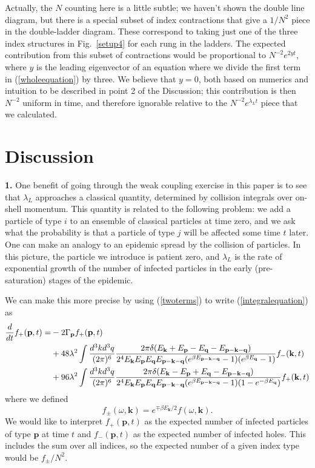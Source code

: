 \documentclass[12pt]{article}
\newcommand{\be}{\begin{equation}}
\newcommand{\ee}{\end{equation}}
\renewcommand{\k}{\mathbf{k}}
\newcommand{\p}{\mathbf{p}}
\newcommand{\q}{\mathbf{q}}
\begin{document}
Actually, the $N$ counting here is a little subtle; we haven't shown the double line diagram, but there is a special subset of index contractions that give a $1/N^2$ piece in the double-ladder diagram. These correspond to taking just one of the three index structures in Fig.~\ref{setup4} for each rung in the ladders. The expected contribution from this subset of contractions would be proportional to $N^{-2}e^{2y t}$, where $y$ is the leading eigenvector of an equation where we divide the first term in (\ref{wholeequation}) by three. We believe that $y = 0$, both based on numerics and intuition to be described in point 2 of the Discussion; this contribution is then $N^{-2}$ uniform in time, and therefore ignorable relative to the $N^{-2}e^{\lambda_L t}$ piece that we calculated.

\section{Discussion}
{\bf 1.} One benefit of going through the weak coupling exercise in this paper is to see that $\lambda_L$ approaches a classical quantity, determined by collision integrals over on-shell momentum. This quantity is related to the following problem: we add a particle of type $i$ to an ensemble of classical particles at time zero, and we ask what the probability is that a particle of type $j$ will be affected some time $t$ later. One can make an analogy to an epidemic \cite{Sekino:2008he,contagion,husekim} spread by the collision of particles. In this picture, the particle we introduce is patient zero, and $\lambda_L$ is the rate of exponential growth of the number of infected particles in the early (pre-saturation) stages of the epidemic.

We can make this more precise by using (\ref{twoterms}) to write (\ref{integralequation}) as
\begin{align}
\frac{d}{dt}f_+(\p,t) = &-2\Gamma_\p f_+(\p,t) \notag\\ &+48\lambda^2\int \frac{d^3k d^3q}{(2\pi)^6}\frac{2\pi\delta(E_\k + E_\p - E_\q - E_{\p - \k - \q})}{2^4E_\k E_\p E_\q E_{\p - \k - \q}(e^{\beta E_{\p - \k - \q}}-1)(e^{\beta E_\q}-1)}f_-(\k,t)\notag\\
&+ 96\lambda^2\int \frac{d^3k d^3q}{(2\pi)^6}\frac{2\pi\delta(E_\k - E_\p + E_\q - E_{\p - \k - \q})}{2^4E_\k E_\p E_\q E_{\p - \k - \q}(e^{\beta E_{\p - \k - \q}}-1)(1-e^{-\beta E_\q})}f_+(\k,t)\label{evolution}
\end{align}
where we defined
\be
f_\pm(\omega,\k) = e^{\mp \beta E_\k/2}f(\omega,\k). 
\ee
We would like to interpret $f_+(\p,t)$ as the expected number of infected particles of type $\p$ at time $t$ and $f_-(\p,t)$ as the expected number of infected holes. This includes the sum over all indices, so the expected number of a given index type would be $f_\pm / N^2$.
\end{document}
